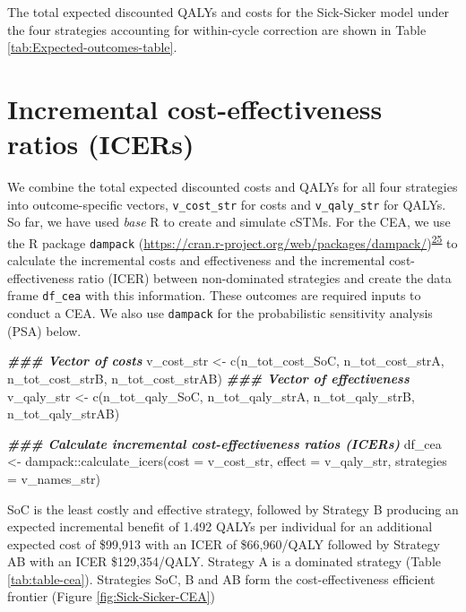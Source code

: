 \documentclass[
]{article}
\newenvironment{Shaded}{\begin{snugshade}}{\end{snugshade}}
\newcommand{\AttributeTok}[1]{\textcolor[rgb]{0.77,0.63,0.00}{#1}}
\newcommand{\DocumentationTok}[1]{\textcolor[rgb]{0.56,0.35,0.01}{\textbf{\textit{#1}}}}
\newcommand{\FunctionTok}[1]{\textcolor[rgb]{0.00,0.00,0.00}{#1}}
\newcommand{\NormalTok}[1]{#1}
\newcommand{\OtherTok}[1]{\textcolor[rgb]{0.56,0.35,0.01}{#1}}
\newcommand{\SpecialCharTok}[1]{\textcolor[rgb]{0.00,0.00,0.00}{#1}}
\begin{document}
The total expected discounted QALYs and costs for the Sick-Sicker model under the four strategies accounting for within-cycle correction are shown in Table \ref{tab:Expected-outcomes-table}.

\hypertarget{incremental-cost-effectiveness-ratios-icers}{%
\section{Incremental cost-effectiveness ratios (ICERs)}\label{incremental-cost-effectiveness-ratios-icers}}

We combine the total expected discounted costs and QALYs for all four strategies into outcome-specific vectors, \texttt{v\_cost\_str} for costs and \texttt{v\_qaly\_str} for QALYs. So far, we have used \emph{base} R to create and simulate cSTMs. For the CEA, we use the R package \texttt{dampack} (\url{https://cran.r-project.org/web/packages/dampack/})\textsuperscript{\protect\hyperlink{ref-Alarid-Escudero2021}{25}} to calculate the incremental costs and effectiveness and the incremental cost-effectiveness ratio (ICER) between non-dominated strategies and create the data frame \texttt{df\_cea} with this information. These outcomes are required inputs to conduct a CEA. We also use \texttt{dampack} for the probabilistic sensitivity analysis (PSA) below.

\begin{Shaded}
\begin{Highlighting}[]
\DocumentationTok{\#\#\# Vector of costs}
\NormalTok{v\_cost\_str }\OtherTok{\textless{}{-}} \FunctionTok{c}\NormalTok{(n\_tot\_cost\_SoC, n\_tot\_cost\_strA, n\_tot\_cost\_strB, n\_tot\_cost\_strAB)}
\DocumentationTok{\#\#\# Vector of effectiveness}
\NormalTok{v\_qaly\_str }\OtherTok{\textless{}{-}} \FunctionTok{c}\NormalTok{(n\_tot\_qaly\_SoC, n\_tot\_qaly\_strA, n\_tot\_qaly\_strB, n\_tot\_qaly\_strAB)}

\DocumentationTok{\#\#\# Calculate incremental cost{-}effectiveness ratios (ICERs)}
\NormalTok{df\_cea }\OtherTok{\textless{}{-}}\NormalTok{ dampack}\SpecialCharTok{::}\FunctionTok{calculate\_icers}\NormalTok{(}\AttributeTok{cost =}\NormalTok{ v\_cost\_str, }
                                   \AttributeTok{effect =}\NormalTok{ v\_qaly\_str,}
                                   \AttributeTok{strategies =}\NormalTok{ v\_names\_str)}
\end{Highlighting}
\end{Shaded}

SoC is the least costly and effective strategy, followed by Strategy B producing an expected incremental benefit of 1.492 QALYs per individual for an additional expected cost of \$99,913 with an ICER of \$66,960/QALY followed by Strategy AB with an ICER \$129,354/QALY. Strategy A is a dominated strategy (Table \ref{tab:table-cea}). Strategies SoC, B and AB form the cost-effectiveness efficient frontier (Figure \ref{fig:Sick-Sicker-CEA})
\end{document}
